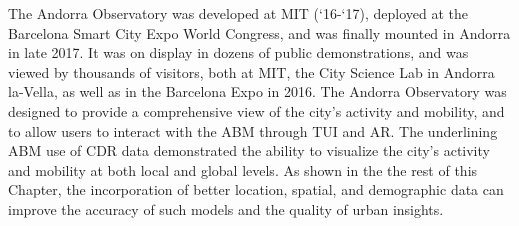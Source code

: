 {{        The Andorra Observatory was developed at MIT (`16-`17), deployed at the Barcelona Smart City Expo World Congress, and was finally mounted in Andorra in late 2017. It was on display in dozens of public demonstrations, and was viewed by thousands of visitors, both at MIT, the City Science Lab in Andorra la-Vella, as well as in the Barcelona Expo in 2016.
        \newline
        The Andorra Observatory was designed to provide a comprehensive view of the city's activity and mobility, and to allow users to interact with the ABM through TUI and AR. The underlining ABM use of CDR data demonstrated the ability to visualize the city's activity and mobility at both local and global levels. As shown in the the rest of this Chapter, the incorporation of better location, spatial, and demographic data can improve the accuracy of such models and the quality of urban insights.

    }
}

